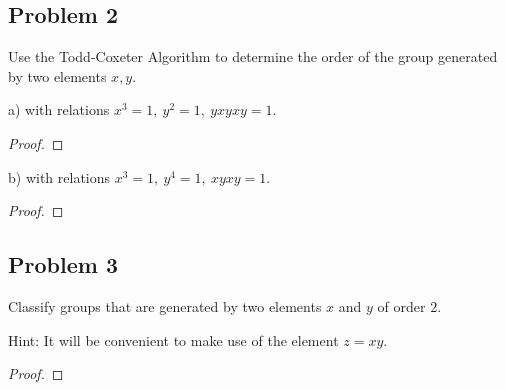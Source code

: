 \documentclass{article}
\theoremstyle{definition}
\begin{document}
\subsection*{Problem 2}

\begin{tcolorbox}
Use the Todd-Coxeter Algorithm to determine the order of the group generated by two elements $x, y$.

a) with relations $x^3 = 1, \> y^2 = 1, \> yxyxy = 1$.
\end{tcolorbox}
\begin{proof}
\end{proof}

\begin{tcolorbox}
b) with relations $x^3 = 1, \> y^4 = 1, \> xyxy = 1$.
\end{tcolorbox}
\begin{proof}
\end{proof}


\subsection*{Problem 3}

\begin{tcolorbox}
Classify groups that are generated by two elements $x$ and $y$ of order $2$.

Hint: It will be convenient to make use of the element $z = xy$.
\end{tcolorbox}
\begin{proof}
\end{proof}
\end{document}
